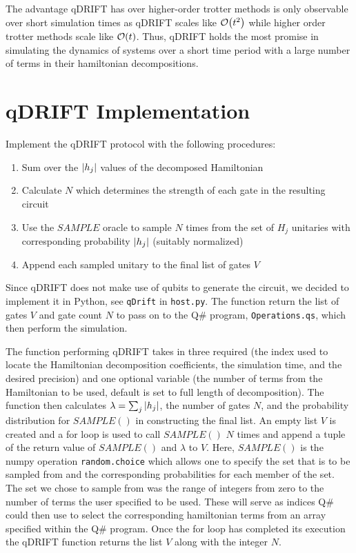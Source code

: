 \documentclass[letterpaper, 11pt]{article}
\begin{document}
The advantage qDRIFT has over higher-order trotter methods is only observable over short simulation times as qDRIFT scales like $\order{t^2}$ while higher order trotter methods scale like $\order{t}$. Thus, qDRIFT holds the most promise in simulating the dynamics of systems over a short time period with a large number of terms in their hamiltonian decompositions. 

\section*{qDRIFT Implementation}
Implement the qDRIFT protocol with the following procedures:

\begin{enumerate}
    \item Sum over the $\abs{h_j}$ values of the decomposed Hamiltonian
    \item Calculate $N$ which determines the strength of each gate in the resulting circuit
    \item Use the $SAMPLE$ oracle to sample $N$ times from the set of $H_j$ unitaries with corresponding probability $\abs{h_j}$ (suitably normalized)
    \item Append each sampled unitary to the final list of gates $V$
\end{enumerate}

Since qDRIFT does not make use of qubits to generate the circuit, we decided to implement it in Python, see \texttt{qDrift} in \texttt{host.py}. The function return the list of gates $V$ and gate count $N$ to pass on to the Q\# program, \texttt{Operations.qs}, which then perform the simulation. 

The function performing qDRIFT takes in three required (the index used to locate the Hamiltonian decomposition coefficients, the simulation time, and the desired precision) and one optional variable (the number of terms from the Hamiltonian to be used, default is set to full length of decomposition). The function then calculates $\lambda = \sum_j \abs{h_j}$, the number of gates $N$, and the probability distribution for $SAMPLE()$ in constructing the final list. An empty list $V$ is created and a for loop is used to call $SAMPLE()$ $N$ times and append a tuple of the return value of $SAMPLE()$ and $\lambda$ to $V$. Here, $SAMPLE()$ is the numpy operation \texttt{random.choice} which allows one to specify the set that is to be sampled from and the corresponding probabilities for each member of the set. The set we chose to sample from was the range of integers from zero to the number of terms the user specified to be used. These will serve as indices Q\# could then use to select the corresponding hamiltonian terms from an array specified within the Q\# program. Once the for loop has completed its execution the qDRIFT function returns the list $V$ along with the integer $N$.      
\end{document}
